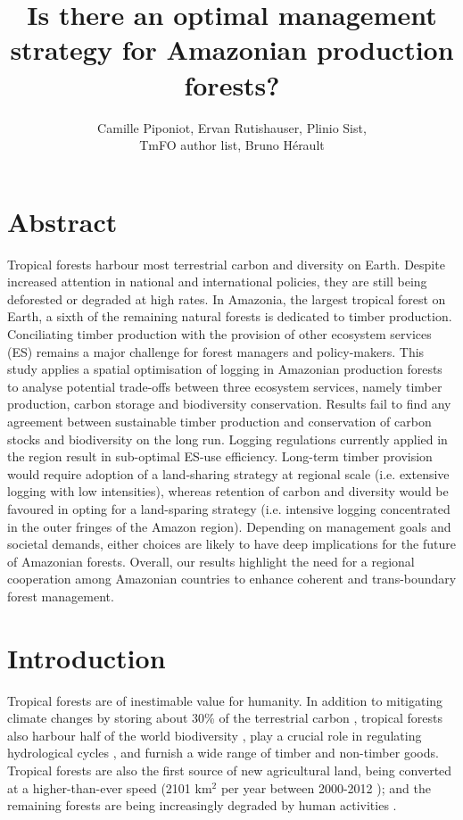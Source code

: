 \documentclass{article}
\title{Is there an optimal management strategy for Amazonian production forests?}
\author{Camille Piponiot, Ervan Rutishauser, Plinio Sist,\\ TmFO author list, Bruno Hérault}
\date{}
\begin{document}
\maketitle 

\section{Abstract}

Tropical forests harbour most terrestrial carbon and diversity on Earth. Despite increased attention in national and international policies, they are still being deforested or degraded at high rates. 
In Amazonia, the largest tropical forest on Earth, a sixth of the remaining natural forests is dedicated to timber production. Conciliating timber production with the provision of other ecosystem services (ES) remains a major challenge for forest managers and policy-makers. This study applies a spatial optimisation of logging in Amazonian production forests to analyse potential trade-offs between three ecosystem services, namely timber production, carbon storage and biodiversity conservation.  
Results fail to find any agreement between sustainable timber production and conservation of carbon stocks and biodiversity on the long run. Logging regulations currently applied in the region result in sub-optimal ES-use efficiency. Long-term timber provision would require adoption of a land-sharing strategy at regional scale (i.e. extensive logging with low intensities), whereas retention of carbon and diversity would be favoured in opting for a land-sparing strategy (i.e. intensive logging concentrated in the outer fringes of the Amazon region). Depending on management goals and societal demands, either choices are likely to have deep implications for the future of Amazonian forests. Overall, our results highlight the need for a regional cooperation among Amazonian countries to enhance coherent and trans-boundary forest management.

\section{Introduction}

Tropical forests are of inestimable value for humanity. In addition to mitigating climate changes by storing about 30\% of the terrestrial carbon \cite{Pan2013}, tropical forests also harbour half of the world biodiversity \cite{Pimm2014}, play a crucial role in regulating hydrological cycles \cite{Fisher2009a}, and furnish a wide range of timber and non-timber goods. Tropical forests are also the first source of new agricultural land, being converted at a higher-than-ever speed (2101 km$^2$ per year between 2000-2012 \cite{Hansen2013}); and the remaining forests are being increasingly degraded by human activities \cite{Potapov2017}. 
\end{document}
